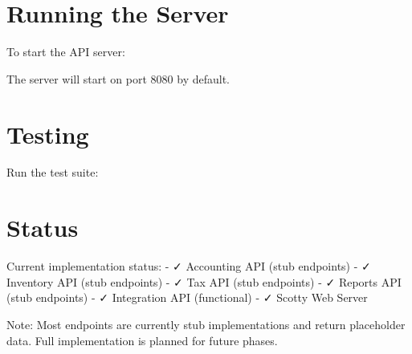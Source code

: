 \section{Running the Server}\label{running-the-server}

To start the API server:

\begin{Shaded}
\begin{Highlighting}[]
\end{Highlighting}
\end{Shaded}

The server will start on port 8080 by default.

\section{Testing}\label{testing}

Run the test suite:

\begin{Shaded}
\begin{Highlighting}[]
\end{Highlighting}
\end{Shaded}

\section{Status}\label{status}

Current implementation status: - ✓ Accounting API (stub endpoints) - ✓
Inventory API (stub endpoints) - ✓ Tax API (stub endpoints) - ✓ Reports
API (stub endpoints) - ✓ Integration API (functional) - ✓ Scotty Web
Server

Note: Most endpoints are currently stub implementations and return
placeholder data. Full implementation is planned for future phases.

